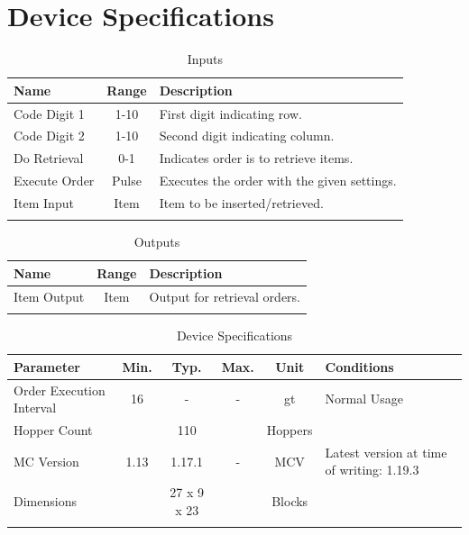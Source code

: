 \documentclass[10pt]{datasheet}
\begin{document}
\onecolumn
\section{Device Specifications}

\begin{table}[h]
    \caption{Inputs}
    \begin{tabularx}{\textwidth}{l | c | X}
        \thickhline
        \textbf{Name} & \textbf{Range} & \textbf{Description} \\
        \hline
        Code Digit 1 & 1-10 & First digit indicating row. \\
        Code Digit 2 & 1-10 & Second digit indicating column. \\
        \hline
        Do Retrieval & 0-1 & Indicates order is to retrieve items.\\
        \hline
        Execute Order & Pulse & Executes the order with the given settings. \\
        \hline
        Item Input & Item & Item to be inserted/retrieved. \\
        \thickhline
\end{tabularx}
\end{table}

\begin{table}[h]
    \caption{Outputs}
    \begin{tabularx}{\textwidth}{l | c | X}
        \thickhline
        \textbf{Name} & \textbf{Range} & \textbf{Description} \\
        \hline
        Item Output & Item & Output for retrieval orders. \\
        \thickhline
\end{tabularx}
\end{table}

\begin{table}[h]
    \caption{Device Specifications}
    \begin{tabularx}{\textwidth}{l | c c c | c | X}
        \thickhline
        \textbf{Parameter} & \textbf{Min.} & \textbf{Typ.} & \textbf{Max.} &
        \textbf{Unit} & \textbf{Conditions} \\
        \hline
        Order Execution Interval & 16 & - & - & gt & Normal Usage\\
        \hline
        Hopper Count & & 110 & & Hoppers & \\
        \hline
        MC Version & 1.13 & 1.17.1 & - & MCV & Latest version at time of writing: 1.19.3\\
        \hline
        Dimensions & & 27 x 9 x 23 & & Blocks & \\
        \thickhline
\end{tabularx}
\end{table}
\newpage
\end{document}
